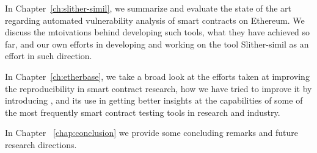   In Chapter~\ref{ch:slither-simil}, we summarize and evaluate the state of the art regarding automated vulnerability analysis of smart contracts on Ethereum. We discuss the mtoivations behind developing such tools, what they have achieved so far, and our own efforts in developing and working on the tool Slither-simil as an effort in such direction.

  In Chapter~\ref{ch:etherbase}, we take a broad look at the efforts taken at improving the reproducibility in smart contract research, how we have tried to improve it by introducing \etherbase, and its use in getting better insights at the capabilities of some of the most frequently smart contract testing tools in research and industry.

  In Chapter ~\ref{chap:conclusion} we provide some concluding remarks and future research directions.